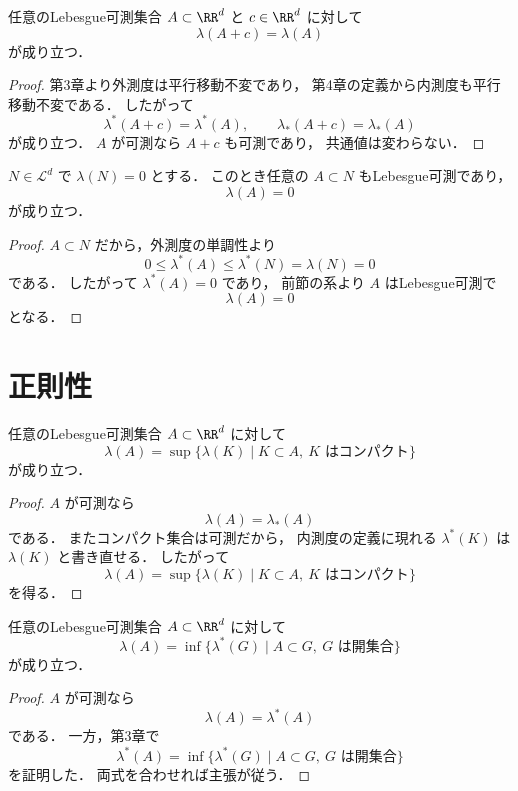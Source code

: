 \begin{proposition}[平行移動不変性]
任意のLebesgue可測集合 $A \subset \RR^d$ と $c \in \RR^d$ に対して
\[
\lambda(A+c)=\lambda(A)
\]
が成り立つ．
\end{proposition}
\begin{proof}
第3章より外測度は平行移動不変であり，
第4章の定義から内測度も平行移動不変である．
したがって
\[
\lambda^*(A+c)=\lambda^*(A),\qquad
\lambda_*(A+c)=\lambda_*(A)
\]
が成り立つ．
$A$ が可測なら $A+c$ も可測であり，
共通値は変わらない．
\end{proof}

\begin{corollary}[零集合の部分集合]
$N \in \mathcal L^d$ で $\lambda(N)=0$ とする．
このとき任意の $A \subset N$ もLebesgue可測であり，
\[
\lambda(A)=0
\]
が成り立つ．
\end{corollary}
\begin{proof}
$A \subset N$ だから，外測度の単調性より
\[
0\le \lambda^*(A)\le \lambda^*(N)=\lambda(N)=0
\]
である．
したがって $\lambda^*(A)=0$ であり，
前節の系より $A$ はLebesgue可測で
\[
\lambda(A)=0
\]
となる．
\end{proof}

\section{正則性}

\begin{theorem}[内正則性]
任意のLebesgue可測集合 $A \subset \RR^d$ に対して
\[
\lambda(A)
=
\sup\{\lambda(K)\mid K \subset A,\ K \text{ はコンパクト}\}
\]
が成り立つ．
\end{theorem}
\begin{proof}
$A$ が可測なら
\[
\lambda(A)=\lambda_*(A)
\]
である．
またコンパクト集合は可測だから，
内測度の定義に現れる $\lambda^*(K)$ は $\lambda(K)$ と書き直せる．
したがって
\[
\lambda(A)
=
\sup\{\lambda(K)\mid K \subset A,\ K \text{ はコンパクト}\}
\]
を得る．
\end{proof}

\begin{theorem}[外正則性]
任意のLebesgue可測集合 $A \subset \RR^d$ に対して
\[
\lambda(A)
=
\inf\{\lambda^*(G)\mid A \subset G,\ G \text{ は開集合}\}
\]
が成り立つ．
\end{theorem}
\begin{proof}
$A$ が可測なら
\[
\lambda(A)=\lambda^*(A)
\]
である．
一方，第3章で
\[
\lambda^*(A)
=
\inf\{\lambda^*(G)\mid A \subset G,\ G \text{ は開集合}\}
\]
を証明した．
両式を合わせれば主張が従う．
\end{proof}


